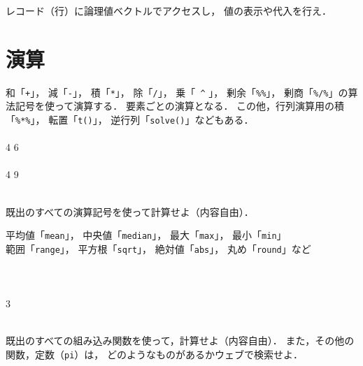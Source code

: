 {
  \MyExercise
  {
    レコード（行）に論理値ベクトルでアクセスし，
    値の表示や代入を行え．
  }
}

\section{演算}

{
  {
    和「\texttt{+}」，
    減「\texttt{-}」，
    積「\texttt{*}」，
    除「\texttt{/}」，
    乗「\texttt{\ \^} 」，
    剰余「\texttt{\%\%}」，
    剰商「\texttt{\%/\%}」の算法記号を使って演算する．
    要素ごとの演算となる．
  }
  この他，行列演算用の積「\texttt{\%*\%}」，
  転置「\texttt{t()}」，
  逆行列「\texttt{solve()}」などもある．
  \MyColsThree
  {
    \MyConsole
    {
      \\
      \\  4 6
    }
  }
  {
    \MyConsole
    {
      \\
      \\  4 9
    }
  }
  {
    \MyConsole
    {
      \\
      \\ 
    }
  }
}

{
  \MyExercise
  {
    既出のすべての演算記号を使って計算せよ（内容自由）．
  }
}

{
  {
    平均値「\texttt{mean}」，
    中央値「\texttt{median}」，
    最大「\texttt{max}」，
    最小「\texttt{min}」\\
    範囲「\texttt{range}」，
    平方根「\texttt{sqrt}」，
    絶対値「\texttt{abs}」，
    丸め「\texttt{round}」など
  }
  \MyColsThree
  {
    \MyConsole
    {
      \\
      \\ 
    }
  }
  {
    \MyConsole
    {
      \\
      \\  3
    }
  }
  {
    \MyConsole
    {
      \\
      \\  
    }
  }
}

{
  \MyExercise
  {
    既出のすべての組み込み関数を使って，計算せよ（内容自由）．
    また，その他の関数，定数（\texttt{pi}）は，
    どのようなものがあるかウェブで検索せよ．
  }
}

